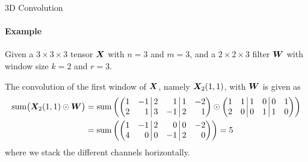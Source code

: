 \begin{frame}{3D Convolution}
\framesubtitle{Example}
Given a $3 \times 3 \times 3$ tensor 
    ${\boldsymbol X}$ with $n=3$ and $m=3$, and a $2 \times 2 \times 3$
    filter ${\boldsymbol W}$ with window size $k=2$ and $r=3$. 

	\medskip

	The convolution of the 
    first window of ${\boldsymbol X}$, namely ${\boldsymbol X}_2(1,1)$, with ${\boldsymbol W}$
    is given as%
    \begin{align*}
        \summ\bigl(\bX_2(1,1) \odot \bW\bigr) & = 
        \summ\lB(
            \amatr{r}{1 & -1 \;\vline\; 2 & 1\;\vline\; 1 & -2\\
                  2 & 1 \;\vline\; 3 & -1\;\vline\; 2 & 1} 
                  \odot 
                  \matr{1 & 1 \;\vline\; 1 & 0\;\vline\; 0 & 1\\
                        2 & 0 \;\vline\; 0 & 1\;\vline\;1 & 0}
        \rB)\\
        & = \summ\lB( 
            \amatr{r}{1 & -1 \;\vline\; 2 & 0\;\vline\; 0 & -2\\
                        4 & 0 \;\vline\; 0 & -1\;\vline\;2 & 0}
    \rB)  = 5
    \end{align*}
    where we stack the different channels horizontally.
\end{frame}
